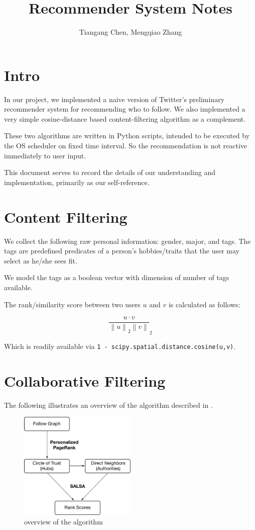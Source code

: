 \documentclass[12pt]{article}
\title{Recommender System Notes}
\author{Tiangang Chen, Mengqiao Zhang}
\newcommand{\norm}[1]{\left\lVert #1 \right\rVert}
\begin{document}
\maketitle
\section{Intro}
In our project, we implemented a naive version of Twitter's preliminary recommender system \cite{wtf} for recommending who to follow. We also implemented a very simple cosine-distance based content-filtering algorithm as a complement.

These two algorithms are written in Python scripts, intended to be executed by the OS scheduler on fixed time interval. So the recommendation is not reactive immediately to user input.

This document serves to record the details of our understanding and implementation, primarily as our self-reference.

\section{Content Filtering}

We collect the following raw personal information: gender, major, and tags. The tags are predefined predicates of a person's hobbies/traits that the user may select as he/she sees fit.

We model the tags as a boolean vector with dimension of number of tags available.

The rank/similarity score between two users $u$ and $v$ is calculated as follows:

\[\frac{u \cdot v}{\norm{u}_2 \norm{v}}_2\]

Which is readily available via \texttt{1 - scipy.spatial.distance.cosine(u,v)}.

\section{Collaborative Filtering}

The following illustrates an overview of the algorithm described in \cite{wtf}.

\begin{figure}[h]
\begin{center}
\includegraphics[width=0.5\textwidth]{wtf-algorithm}
\caption{overview of the algorithm}
\end{center}
\end{figure}
\end{document}
